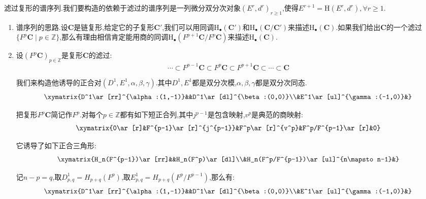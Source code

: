 滤过复形的谱序列.我们要构造的依赖于滤过的谱序列是一列微分双分次对象$(E^r,d^r)_{r\ge1}$,使得$E^{r+1}=\mathrm{H}(E^r,d^r),\forall r\ge1$.
\begin{enumerate}
	\item 谱序列的思路.设$\textbf{C}$是链复形,给定它的子复形$\textbf{C}'$,我们可以用同调$\mathrm{H}_{\bullet}(\textbf{C}')$和$\mathrm{H}_{\bullet}(\textbf{C}/\textbf{C}')$来描述$\mathrm{H}_{\bullet}(\textbf{C})$.如果我们给出$\textbf{C}$的一个滤过$\{F^p\textbf{C}\mid p\in\mathbb{Z}\}$,那么有理由相信肯定能用商的同调$\mathrm{H}_{\bullet}(F^{p+1}\textbf{C}/F^p\textbf{C})$来描述$\mathrm{H}_{\bullet}(\textbf{C})$.
	\item 设$(F^p\textbf{C})_{p\in\mathbb{Z}}$是复形$\textbf{C}$的滤过:
	$$\cdots\subset F^{p-1}\textbf{C}\subset F^p\textbf{C}\subset F^{p+1}\textbf{C}\subset\cdots\subset\textbf{C}$$
	
	我们来构造他诱导的正合对$(D^1,E^1,\alpha,\beta,\gamma)$.其中$D^1,E^1$都是双分次模,$\alpha,\beta,\gamma$都是双分次同态.
	$$\xymatrix{D^1\ar[rr]^{\alpha:(1,-1)}&&D^1\ar[dl]^{\beta:(0,0)}\\&E^1\ar[ul]^{\gamma:(-1,0)}&}$$
	
	把复形$F^p\textbf{C}$简记作$F^p$.对每个$p\in\mathbb{Z}$都有如下短正合列,其中$j^{p-1}$是包含映射,$v^p$是典范的商映射:
	$$\xymatrix{0\ar[r]&F^{p-1}\ar[r]^{j^{p-1}}&F^p\ar[r]^{v^p}&F^p/F^{p-1}\ar[r]&0}$$
	
	它诱导了如下正合三角形:
	$$\xymatrix{H_n(F^{p-1})\ar[rr]&&H_n(F^p)\ar[dl]\\&H_n(F^p/F^{p-1})\ar[ul]^{n\mapsto n-1}&}$$
	
	记$n-p=q$,取$D^1_{p,q}=H_{p+q}(F^p)$,取$E^1_{p,q}=H_{p+q}(F^p/F^{p-1})$,那么有:
	$$\xymatrix{D^1\ar[rr]^{\alpha:(1,-1)}&&D^1\ar[dl]^{\beta:(0,0)}\\&E^1\ar[ul]^{\gamma:(-1,0)}&}$$
	

\end{enumerate}
